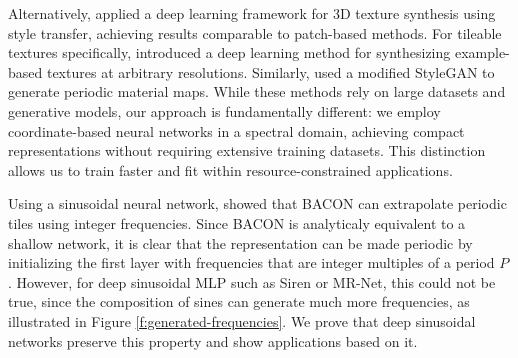 Alternatively, \citet{Gutierrez-2019} applied a deep learning framework for 3D texture synthesis using style transfer, achieving results comparable to patch-based methods. For tileable textures specifically, \citet{deeptile} introduced a deep learning method for synthesizing example-based textures at arbitrary resolutions. Similarly, \citet{zhou2022tilegen} used a modified StyleGAN to generate periodic material maps. While these methods rely on large datasets and generative models, our approach is fundamentally different: we employ coordinate-based neural networks in a spectral domain, achieving compact representations without requiring extensive training datasets. This distinction allows us to train faster and fit within resource-constrained applications.


Using a sinusoidal neural network, \citet{bacon2021} showed that BACON can extrapolate periodic tiles using integer frequencies. Since BACON is analyticaly equivalent to a shallow network, it is clear that the representation can be made periodic by initializing the first layer with frequencies that are integer multiples of a period $P$. However, for deep sinusoidal MLP such as Siren \cite{sitzmann2019siren} or MR-Net, this could not be true, since the composition of sines can generate much more frequencies, as illustrated in Figure \ref{f:generated-frequencies}. We prove that deep sinusoidal networks preserve this property and show applications based on it.


